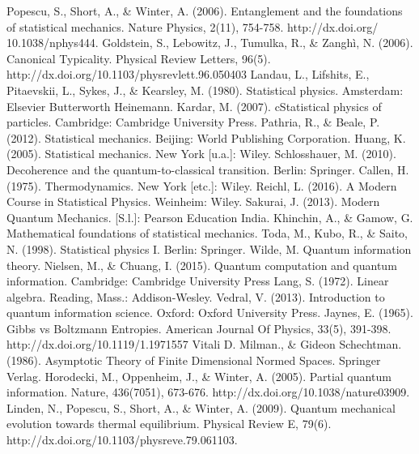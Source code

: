 \documentclass[11pt]{book}
\theoremstyle{definition}
\begin{document}
\begin{thebibliography}{10}
 Popescu, S., Short, A., \& Winter, A. (2006). Entanglement and the foundations of statistical mechanics. Nature Physics, 2(11), 754-758. http://dx.doi.org/ 10.1038/nphys444.
 Goldstein, S., Lebowitz, J., Tumulka, R., \& Zanghì, N. (2006). Canonical Typicality. Physical Review Letters, 96(5). http://dx.doi.org/10.1103/physrevlett.96.050403
 Landau, L., Lifshits, E., Pitaevskii, L., Sykes, J., \& Kearsley, M. (1980). Statistical physics. Amsterdam: Elsevier Butterworth Heinemann.
Kardar, M. (2007). cStatistical physics of particles. Cambridge: Cambridge University Press.
Pathria, R., \& Beale, P. (2012). Statistical mechanics. Beijing: World Publishing Corporation.
Huang, K. (2005). Statistical mechanics. New York [u.a.]: Wiley.
Schlosshauer, M. (2010). Decoherence and the quantum-to-classical transition. Berlin: Springer.
Callen, H. (1975). Thermodynamics. New York [etc.]: Wiley.
Reichl, L. (2016). A Modern Course in Statistical Physics. Weinheim: Wiley.
Sakurai, J. (2013). Modern Quantum Mechanics. [S.l.]: Pearson Education India.
Khinchin, A., \& Gamow, G. Mathematical foundations of statistical mechanics.
Toda, M., Kubo, R., \& Saito, N. (1998). Statistical physics I. Berlin: Springer.
Wilde, M. Quantum information theory.
 Nielsen, M., \& Chuang, I. (2015). Quantum computation and quantum information. Cambridge: Cambridge University Press
Lang, S. (1972). Linear algebra. Reading, Mass.: Addison-Wesley.
Vedral, V. (2013). Introduction to quantum information science. Oxford: Oxford University Press.
Jaynes, E. (1965). Gibbs vs Boltzmann Entropies. American Journal Of Physics, 33(5), 391-398. http://dx.doi.org/10.1119/1.1971557
Vitali D. Milman., \& Gideon Schechtman. (1986). Asymptotic Theory of Finite Dimensional Normed Spaces. Springer Verlag.
Horodecki, M., Oppenheim, J., \& Winter, A. (2005). Partial quantum information. Nature, 436(7051), 673-676. http://dx.doi.org/10.1038/nature03909.
Linden, N., Popescu, S., Short, A., \& Winter, A. (2009). Quantum mechanical evolution towards thermal equilibrium. Physical Review E, 79(6). http://dx.doi.org/10.1103/physreve.79.061103.

\end{thebibliography}
\end{document}
